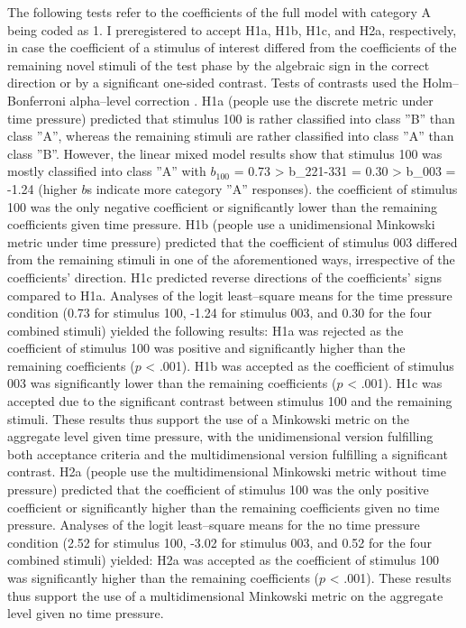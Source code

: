 \documentclass[a4paper,man,natbib]{apa6}
\begin{document}
The following tests refer to the coefficients of the full model with category A being coded as 1. I preregistered to accept H1a, H1b, H1c, and H2a, respectively, in case the coefficient of a stimulus of interest differed from the coefficients of the remaining novel stimuli of the test phase by the algebraic sign in the correct direction or by a significant one-sided contrast. Tests of contrasts used the Holm--Bonferroni alpha--level correction \citep{holm1979simple}. H1a (people use the discrete metric under time pressure) predicted that stimulus 100 is rather classified into class ''B'' than class ''A'', whereas the remaining stimuli are rather classified into class ''A'' than class ''B''. However, the linear mixed model results show that stimulus 100 was mostly classified into class ''A'' with $b_{100}$ = 0.73 > b_221-331 = 0.30 > b_003 = -1.24 (higher $b$s indicate more category ''A'' responses). the coefficient of stimulus 100 was the only negative coefficient or significantly lower than the remaining coefficients given time pressure. H1b (people use a unidimensional Minkowski metric under time pressure) predicted that the coefficient of stimulus 003 differed from the remaining stimuli in one of the aforementioned ways, irrespective of the coefficients' direction. H1c predicted reverse directions of the coefficients' signs compared to H1a. Analyses of the logit least--square means for the time pressure condition (0.73 for stimulus 100, -1.24 for stimulus 003, and 0.30 for the four combined stimuli) yielded the following results: H1a was rejected as the coefficient of stimulus 100 was positive and significantly higher than the remaining coefficients ($p$ < .001). H1b was accepted as the coefficient of stimulus 003 was significantly lower than the remaining coefficients ($p$ < .001). H1c was accepted due to the significant contrast between stimulus 100 and the remaining stimuli. These results thus support the use of a Minkowski metric on the aggregate level given time pressure, with the unidimensional version fulfilling both acceptance criteria and the multidimensional version fulfilling a significant contrast. H2a (people use the multidimensional Minkowski metric without time pressure) predicted that the coefficient of stimulus 100 was the only positive coefficient or significantly higher than the remaining coefficients given no time pressure. Analyses of the logit least--square means for the no time pressure condition (2.52 for stimulus 100, -3.02 for stimulus 003, and 0.52 for the four combined stimuli) yielded: H2a was accepted as the coefficient of stimulus 100 was significantly higher than the remaining coefficients ($p$ < .001). These results thus support the use of a multidimensional Minkowski metric on the aggregate level given no time pressure.
\end{document}
